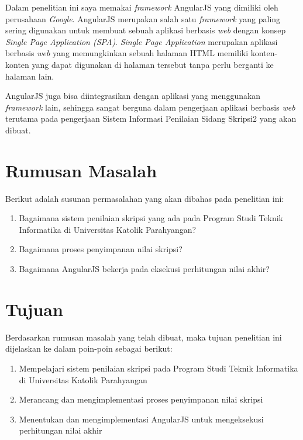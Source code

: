 	Dalam penelitian ini saya memakai \textit{framework} AngularJS yang dimiliki oleh perusahaan \textit{Google}. AngularJS merupakan salah satu \textit{framework} yang paling sering digunakan untuk membuat sebuah aplikasi berbasis \textit{web} dengan konsep \textit{Single Page Application (SPA)}. \textit{Single Page Application} merupakan aplikasi berbasis \textit{web} yang memungkinkan sebuah halaman HTML memiliki konten-konten yang dapat digunakan di halaman tersebut tanpa perlu berganti ke halaman lain.
	
	AngularJS juga bisa diintegrasikan dengan aplikasi yang menggunakan \textit{framework} lain, sehingga sangat berguna dalam pengerjaan aplikasi berbasis \textit{web} terutama pada pengerjaan Sistem Informasi Penilaian Sidang Skripsi2 yang akan dibuat.
	
\section{Rumusan Masalah}
\label{sec: rumusanMasalah}

	Berikut adalah susunan permasalahan yang akan dibahas pada penelitian ini:
	\begin{enumerate}
		\item Bagaimana sistem penilaian skripsi yang ada pada Program Studi Teknik Informatika di Universitas Katolik Parahyangan?
		\item Bagaimana proses penyimpanan nilai skripsi?
		\item Bagaimana AngularJS bekerja pada eksekusi perhitungan nilai akhir?
	\end{enumerate}

\section{Tujuan}
\label{sec: tujuan}

	Berdasarkan rumusan masalah yang telah dibuat, maka tujuan penelitian ini dijelaskan ke dalam poin-poin sebagai berikut:
	\begin{enumerate}
		\item Mempelajari sistem penilaian skripsi pada Program Studi Teknik Informatika di Universitas Katolik Parahyangan
		\item Merancang dan mengimplementasi proses penyimpanan nilai skripsi
		\item Menentukan dan mengimplementasi AngularJS untuk mengeksekusi perhitungan nilai akhir
	\end{enumerate}
	
